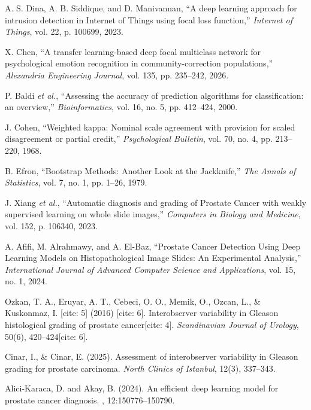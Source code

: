  A. S. Dina, A. B. Siddique, and D. Manivannan, ``A deep learning approach for intrusion detection in Internet of Things using focal loss function,'' \textit{Internet of Things}, vol. 22, p. 100699, 2023.

 X. Chen, ``A transfer learning-based deep focal multiclass network for psychological emotion recognition in community-correction populations,'' \textit{Alexandria Engineering Journal}, vol. 135, pp. 235--242, 2026.

 P. Baldi \textit{et al.}, ``Assessing the accuracy of prediction algorithms for classification: an overview,'' \textit{Bioinformatics}, vol. 16, no. 5, pp. 412--424, 2000.

 J. Cohen, ``Weighted kappa: Nominal scale agreement with provision for scaled disagreement or partial credit,'' \textit{Psychological Bulletin}, vol. 70, no. 4, pp. 213--220, 1968.

 B. Efron, ``Bootstrap Methods: Another Look at the Jackknife,'' \textit{The Annals of Statistics}, vol. 7, no. 1, pp. 1--26, 1979.

 J. Xiang \textit{et al.}, ``Automatic diagnosis and grading of Prostate Cancer with weakly supervised learning on whole slide images,'' \textit{Computers in Biology and Medicine}, vol. 152, p. 106340, 2023.

 A. Afifi, M. Alrahmawy, and A. El-Baz, ``Prostate Cancer Detection Using Deep Learning Models on Histopathological Image Slides: An Experimental Analysis,'' \textit{International Journal of Advanced Computer Science and Applications}, vol. 15, no. 1, 2024.

Ozkan, T. A., Eruyar, A. T., Cebeci, O. O., Memik, O., Ozcan, L., \& Kuskonmaz, I. [cite: 5] (2016) [cite: 6]. Interobserver variability in Gleason histological grading of prostate cancer[cite: 4]. \textit{Scandinavian Journal of Urology}, 50(6), 420--424[cite: 6].

Cinar, I., \& Cinar, E. (2025). Assessment of interobserver variability in Gleason grading for prostate carcinoma. \textit{North Clinics of Istanbul}, 12(3), 337--343.

Alici-Karaca, D. and Akay, B. (2024).
\newblock An efficient deep learning model for prostate cancer diagnosis.
, 12:150776--150790.

